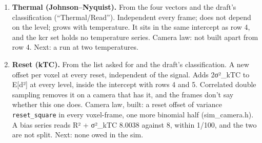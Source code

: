 \begin{enumerate}
\item \textbf{Thermal (Johnson–Nyquist).} From the four vectors and the draft's classification (“Thermal/Read”). Independent every frame; does not depend on the level; grows with temperature. It sits in the same intercept as row 4, and the kcr set holds no temperature series. Camera law: not built apart from row 4. Next: a run at two temperatures.
\item \textbf{Reset (kTC).} From the list asked for and the draft's classification. A new offset per voxel at every reset, independent of the signal. Adds 2σ²\_\allowbreak{}kTC to E[d²] at every level, inside the intercept with rows 4 and 5. Correlated double sampling removes it on a camera that has it, and the frames don't say whether this one does. Camera law, built: a reset offset of variance \texttt{reset\_\allowbreak{}square} in every voxel-frame, one more binomial half (sim\_\allowbreak{}camera.h). A bias series reads R² + σ²\_\allowbreak{}kTC 8.0038 against 8, within 1/100, and the two are not split. Next: none owed in the sim.


\end{enumerate}
